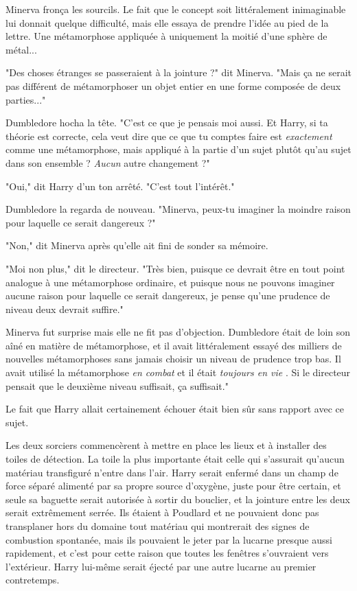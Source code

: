 Minerva fronça les sourcils. Le fait que le concept soit littéralement inimaginable lui donnait quelque difficulté, mais elle essaya de prendre l'idée au pied de la lettre. Une métamorphose appliquée à uniquement la moitié d'une sphère de métal...

"Des choses étranges se passeraient à la jointure ?" dit Minerva. "Mais ça ne serait pas différent de métamorphoser un objet entier en une forme composée de deux parties..."

Dumbledore hocha la tête. "C'est ce que je pensais moi aussi. Et Harry, si ta théorie est correcte, cela veut dire que ce que tu comptes faire est \emph{exactement}  comme une métamorphose, mais appliqué à la partie d'un sujet plutôt qu'au sujet dans son ensemble ? \emph{Aucun } autre changement ?"

"Oui," dit Harry d'un ton arrêté. "C'est tout l'intérêt."

Dumbledore la regarda de nouveau. "Minerva, peux-tu imaginer la moindre raison pour laquelle ce serait dangereux ?"

"Non," dit Minerva après qu'elle ait fini de sonder sa mémoire.

"Moi non plus," dit le directeur. "Très bien, puisque ce devrait être en tout point analogue à une métamorphose ordinaire, et puisque nous ne pouvons imaginer aucune raison pour laquelle ce serait dangereux, je pense qu'une prudence de niveau deux devrait suffire."

Minerva fut surprise mais elle ne fit pas d'objection. Dumbledore était de loin son aîné en matière de métamorphose, et il avait littéralement essayé des milliers de nouvelles métamorphoses sans jamais choisir un niveau de prudence trop bas. Il avait utilisé la métamorphose \emph{en combat}  et il était \emph{toujours en vie} . Si le directeur pensait que le deuxième niveau suffisait, ça suffisait."

Le fait que Harry allait certainement échouer était bien sûr sans rapport avec ce sujet.

Les deux sorciers commencèrent à mettre en place les lieux et à installer des toiles de détection. La toile la plus importante était celle qui s'assurait qu'aucun matériau transfiguré n'entre dans l'air. Harry serait enfermé dans un champ de force séparé alimenté par sa propre source d'oxygène, juste pour être certain, et seule sa baguette serait autorisée à sortir du bouclier, et la jointure entre les deux serait extrêmement serrée. Ils étaient à Poudlard et ne pouvaient donc pas transplaner hors du domaine tout matériau qui montrerait des signes de combustion spontanée, mais ils pouvaient le jeter par la lucarne presque aussi rapidement, et c'est pour cette raison que toutes les fenêtres s'ouvraient vers l'extérieur. Harry lui-même serait éjecté par une autre lucarne au premier contretemps.

